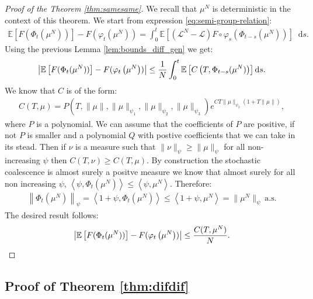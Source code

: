 \documentclass[11pt,a4paper]{article}
\newcommand{\LC}{\mathcal{L}}
\newcommand{\E}[1]{\mathbb{E}\left[#1\right]}
\newcommand{\brac}[1]{\left\langle#1\right\rangle}
\newcommand{\dd}{\mathop{}\!\mathrm{d}}
\begin{document}
\begin{proof}[Proof of the Theorem \ref{thm:samesame}]
 We recall that $\mu^N$ is deterministic in the context of this theorem. We start from expression \eqref{eq:semi-group-relation}:
 \begin{align*}
\E{F(\Phi_t(\mu^N))} - F(\varphi_t\left(\mu^N\right)) = \int_0^t \E{\left(\LC^N - \LC\right)F \circ \varphi_s (\Phi_{t-s}(\mu^N))}\dd s.
\end{align*}
Using the previous Lemma \ref{lem:bounds_diff_gen} we get:
\begin{align*}
    \left|\vphantom{A^2} \E{F(\Phi_t(\mu^N))} - F(\varphi_t\left(\mu^N\right))\right| \leq \dfrac{1}{N} \int_0^t \E{C\left(T,\Phi_{t -s }(\mu^N)\right)} \dd s.
\end{align*}
We know that $C$ is of the form:
\begin{align*}
    C(T,\mu) = P(T,\|\mu\|,\|\mu\|_{\psi_1},\|\mu\|_{\psi_2},\|\mu\|_{\psi_3}) e^{CT\|\mu\|_{\psi_2}(1 + T\|\mu\|)},
\end{align*}
where $P$ is a polynomial. We can assume that the coefficients of $P$ are positive, if not $P$ is smaller and a polynomial $Q$ with postive coefficients that we can take in its stead. Then if $\nu$ is a measure such that $\|\nu\|_{\psi} \geq \|\mu\|_{\psi}$ for all non-increasing $\psi$ then $C(T,\nu) \geq C(T,\mu)$. By construction the stochastic coalescence is almost surely a positve measure we know that almost surely for all non increasing $\psi$, $\brac{\psi,\Phi_t(\mu^N)} \leq \brac{\psi,\mu^N}$. Therefore:
\begin{align*}
    \left\|\Phi_t(\mu^N) \right\|_{\psi} = \brac{1 + \psi,\Phi_t(\mu^N)} \leq \brac{1 + \psi,\mu^N} = \|\mu^N\|_{\psi}\ \text{a.s}.
\end{align*}
The desired result follows:
\begin{align*}
     \left|\vphantom{A^2} \E{F(\Phi_t(\mu^N))} - F(\varphi_t\left(\mu^N\right))\right| \leq \dfrac{C(T,\mu^N)}{N}. 
\end{align*}
\end{proof}

\subsection{Proof of Theorem \ref{thm:difdif}}
\end{document}
